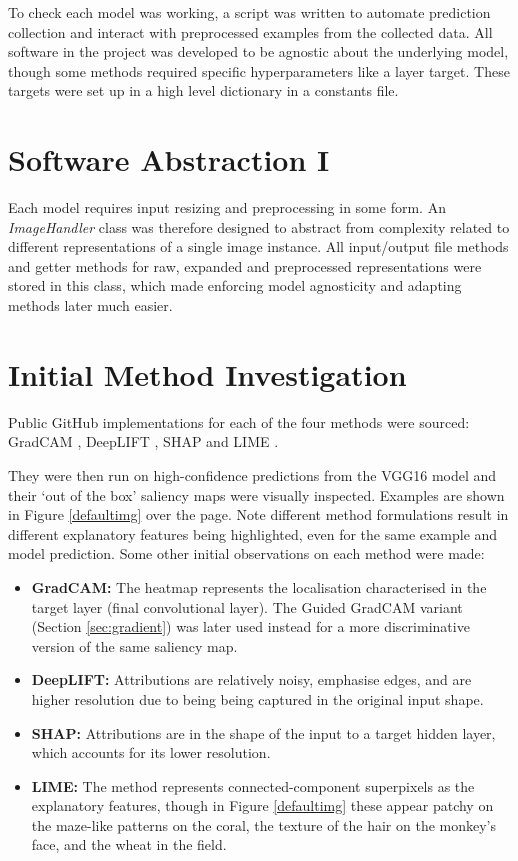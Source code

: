 \documentclass[main]{subfiles}
\begin{document}
To check each model was working, a script was written to automate prediction collection and interact with preprocessed examples from the collected data. All software in the project was developed to be agnostic about the underlying model, though some methods required specific hyperparameters like a layer target. These targets were set up in a high level dictionary in a constants file.

\section{Software Abstraction I}  \label{sec:sw1}

Each model requires input resizing and preprocessing in some form. An \textit{ImageHandler} class was therefore designed to abstract from complexity related to different representations of a single image instance. All input/output file methods and getter methods for raw, expanded and preprocessed representations were stored in this class, which made enforcing model agnosticity and adapting methods later much easier.


\newpage
\section{Initial Method Investigation}  \label{sec:initial}

Public GitHub implementations for each of the four methods were sourced: GradCAM \cite{gradcamrepo}, DeepLIFT \cite{deepliftwrapperrepo}, SHAP \cite{shaprepo} and LIME \cite{limerepo}.

They were then run on high-confidence predictions from the VGG16 model and their `out of the box' saliency maps were visually inspected. Examples are shown in Figure \ref{defaultimg} over the page. Note  different method formulations result in different explanatory features being highlighted, even for the same example and model prediction. Some other initial observations on each method were made:

\begin{itemize}
\item \textbf{GradCAM:} The heatmap represents the localisation characterised in the target layer (final convolutional layer). The Guided GradCAM variant (Section \ref{sec:gradient}) was later used instead for a more discriminative version of the same saliency map.
\item \textbf{DeepLIFT:} Attributions are relatively noisy, emphasise edges, and are higher resolution due to being being captured in the original input shape.
\item \textbf{SHAP:} Attributions are in the shape of the input to a target hidden layer, which accounts for its lower resolution. 
\item \textbf{LIME:} The method represents connected-component superpixels as the explanatory features, though in Figure \ref{defaultimg} these appear patchy on the maze-like patterns on the coral, the texture of the hair on the monkey's face, and the wheat in the field.
\end{itemize}
\end{document}
